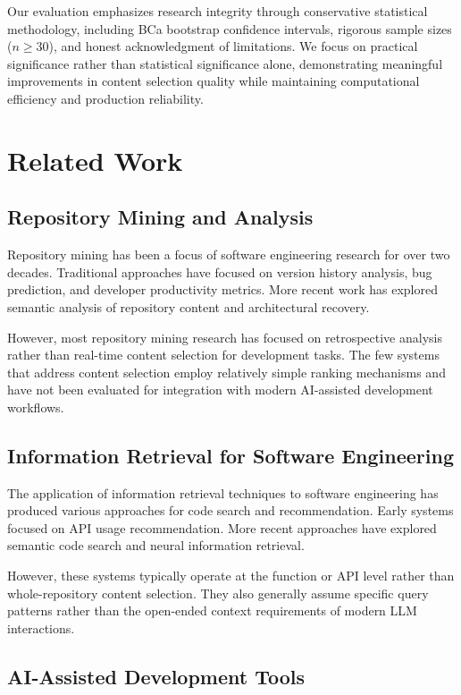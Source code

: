 \documentclass[conference]{IEEEtran}
\begin{document}
Our evaluation emphasizes research integrity through conservative statistical methodology, including BCa bootstrap confidence intervals, rigorous sample sizes ($n \geq 30$), and honest acknowledgment of limitations. We focus on practical significance rather than statistical significance alone, demonstrating meaningful improvements in content selection quality while maintaining computational efficiency and production reliability.

\section{Related Work}

\subsection{Repository Mining and Analysis}

Repository mining has been a focus of software engineering research for over two decades. Traditional approaches have focused on version history analysis, bug prediction, and developer productivity metrics. More recent work has explored semantic analysis of repository content and architectural recovery.

However, most repository mining research has focused on retrospective analysis rather than real-time content selection for development tasks. The few systems that address content selection employ relatively simple ranking mechanisms and have not been evaluated for integration with modern AI-assisted development workflows.

\subsection{Information Retrieval for Software Engineering}

The application of information retrieval techniques to software engineering has produced various approaches for code search and recommendation. Early systems focused on API usage recommendation. More recent approaches have explored semantic code search and neural information retrieval.

However, these systems typically operate at the function or API level rather than whole-repository content selection. They also generally assume specific query patterns rather than the open-ended context requirements of modern LLM interactions.

\subsection{AI-Assisted Development Tools}
\end{document}
